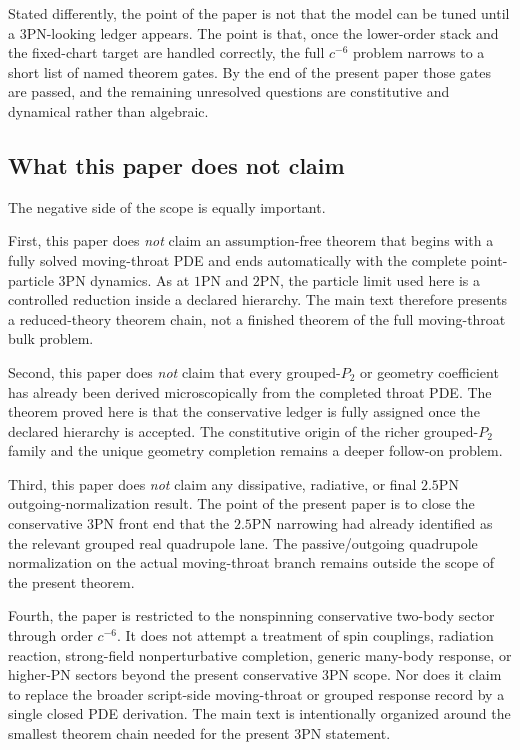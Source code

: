 \documentclass[11pt]{article}
\begin{document}
Stated differently, the point of the paper is not that the model can be tuned
until a $3$PN-looking ledger appears.  The point is that, once the lower-order
stack and the fixed-chart target are handled correctly, the full $c^{-6}$
problem narrows to a short list of named theorem gates.  By the end of the
present paper those gates are passed, and the remaining unresolved questions are
constitutive and dynamical rather than algebraic.

\subsection{What this paper does not claim}
\label{sec:intro-nonclaims}

The negative side of the scope is equally important.

First, this paper does \emph{not} claim an assumption-free theorem that begins
with a fully solved moving-throat PDE and ends automatically with the complete
point-particle $3$PN dynamics.  As at $1$PN and $2$PN, the particle limit used
here is a controlled reduction inside a declared hierarchy.  The main text
therefore presents a reduced-theory theorem chain, not a finished theorem of the
full moving-throat bulk problem.

Second, this paper does \emph{not} claim that every grouped-$P_2$ or geometry
coefficient has already been derived microscopically from the completed throat
PDE.  The theorem proved here is that the conservative ledger is fully assigned
once the declared hierarchy is accepted.  The constitutive origin of the richer
grouped-$P_2$ family and the unique geometry completion remains a deeper
follow-on problem.

Third, this paper does \emph{not} claim any dissipative, radiative, or final
$2.5$PN outgoing-normalization result.  The point of the present paper is to
close the conservative $3$PN front end that the $2.5$PN narrowing had already
identified as the relevant grouped real quadrupole lane.  The passive/outgoing
quadrupole normalization on the actual moving-throat branch remains outside the
scope of the present theorem.

Fourth, the paper is restricted to the nonspinning conservative two-body sector
through order $c^{-6}$.  It does not attempt a treatment of spin couplings,
radiation reaction, strong-field nonperturbative completion, generic many-body
response, or higher-PN sectors beyond the present conservative $3$PN scope.
Nor does it claim to replace the broader script-side moving-throat or grouped
response record by a single closed PDE derivation.  The main text is
intentionally organized around the smallest theorem chain needed for the present
$3$PN statement.
\end{document}
